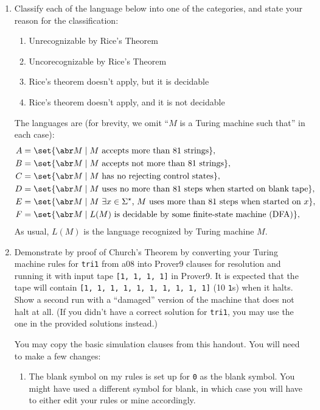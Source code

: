\documentclass{cs81-homework}
\begin{document}
\begin{enumerate}
\item {} Classify each of the language below into one of the
  categories, and state your reason for the classification:
  \begin{enumerate}[label=\Roman*.]
  \item Unrecognizable by Rice's Theorem
  \item Uncorecognizable by Rice's Theorem
  \item Rice's theorem doesn't apply, but it is decidable
  \item Rice's theorem doesn't apply, and it is not decidable
  \end{enumerate}
  The languages are (for brevity, we omit ``\(M\) is a Turing machine such
  that'' in each case):
  \begin{align*}
    A &= \set{\abr M \mid \text{\(M\) accepts more than 81 strings}}, \\
    B &= \set{\abr M \mid \text{\(M\) accepts not more than 81 strings}}, \\
    C &= \set{\abr M \mid \text{\(M\) has no rejecting control states}}, \\
    D &= \set{\abr M \mid \text{\(M\) uses no more than \(81\) steps when started on blank tape}}, \\
    E &= \set{\abr M \mid \text{\(M\) \(\exists x \in \Sigma^\star\),
        \(M\) uses more than 81 steps when started on \(x\)}}, \\
    F &= \set{\abr M \mid \text{\(L(M)\) is decidable by some finite-state machine (DFA)}}, \\
  \end{align*}
  As usual, \(L(M)\) is the language recognized by Turing machine \(M\).

  \begin{solution}
  \end{solution}

\item {} Demonstrate by proof of Church's Theorem by converting your
  Turing machine rules for \texttt{tri1} from a08 into Prover9 clauses for
  resolution and running it with input tape \texttt{[1, 1, 1, 1]} in Prover9.
  It is expected that the tape will contain \texttt{[1, 1, 1, 1, 1, 1, 1, 1, 1,
    1]} (10 \texttt{1}s) when it halts.  Show a second run with a ``damaged''
  version of the machine that does not halt at all.  (If you didn't have a
  correct solution for \texttt{tri1}, you may use the one in the provided
  solutions instead.)

  You may copy the basic simulation clauses from this handout.  You will need to
  make a few changes:
  \begin{enumerate}[label=\alph*.]
  \item The blank symbol on my rules is set up for \texttt{0} as the blank
    symbol.  You might have used a different symbol for blank, in which case you
    will have to either edit your rules or mine accordingly.


\end{enumerate}
\end{enumerate}
\end{document}
